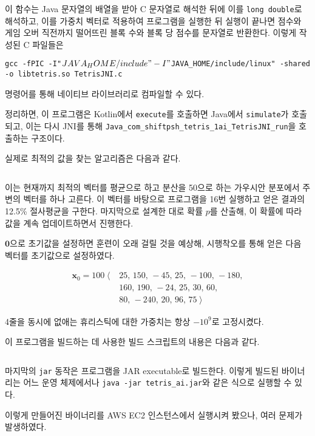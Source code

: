이 함수는 Java 문자열의 배열을 받아 C 문자열로 해석한 뒤에 이를 \texttt{long double}로 해석하고, 이를 가중치 벡터로 적용하여
프로그램을 실행한 뒤 실행이 끝나면 점수와 게임 오버 직전까지 떨어뜨린 블록 수와 블록 당 점수를 문자열로 반환한다. 이렇게 작성된 C 파일들은

\texttt{gcc -fPIC -I"$JAVA_HOME/include" -I"$JAVA_HOME/include/linux" -shared -o libtetris.so TetrisJNI.c}

명령어를 통해 네이티브 라이브러리로 컴파일할 수 있다.\cite{JNI}

정리하면, 이 프로그램은 Kotlin에서 \texttt{execute}를 호출하면 Java에서
\texttt{simulate}가 호출되고, 이는 다시 JNI를 통해
\texttt{Java_com_shiftpsh_tetris_1ai_TetrisJNI_run}을
호출하는 구조이다.

실제로 최적의 값을 찾는 알고리즘은 다음과 같다.

\inputminted[xleftmargin=\parindent,linenos,firstline=27,lastline=63,breaklines]{kotlin}{inc-sources-java/main.kt}

이는 현재까지 최적의 벡터를 평균으로 하고 분산을 50으로 하는 가우시안 분포에서 주변의 벡터를 하나 고른다. 이 벡터를 바탕으로 프로그램을 16번 실행하고 얻은 결과의
12.5\% 절사평균을 구한다. 마지막으로 설계한 대로 확률 $p$를 산출해, 이 확률에 따라 값을 계속 업데이트하면서 진행한다.

$\mathbf{0}$으로 초기값을 설정하면 훈련이 오래 걸릴 것을 예상해, 시행착오를 통해 얻은 다음 벡터를 초기값으로 설정하였다.

\begin{align*}
    \mathbf{x}_0 = 100 \left<\right.& 25,\,150,\,-45,\,25,\,-100,\,-180, \\
    & 160,\,190,\,-24,\,25,\,30,\,60,\\
    & 80,\,-240,\,20,\,96,\,75 \left.\right>
\end{align*}

4줄을 동시에 없애는 휴리스틱에 대한 가중치는 항상 $-10^9$로 고정시켰다.

이 프로그램을 빌드하는 데 사용한 빌드 스크립트의 내용은 다음과 같다.

\inputminted[xleftmargin=\parindent,linenos,breaklines]{text}{inc-sources-java/build.gradle}

마지막의 \texttt{jar} 동작은 프로그램을 JAR executable로 빌드한다. 이렇게 빌드된 바이너리는
어느 운영 체제에서나 \texttt{java -jar tetris_ai.jar}와 같은 식으로 실행할 수 있다.

이렇게 만들어진 바이너리를 AWS EC2 인스턴스에서 실행시켜 봤으나, 여러 문제가 발생하였다.

